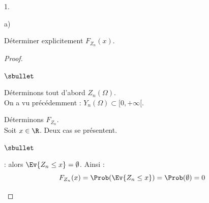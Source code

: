 \documentclass[11pt]{article}%
\begin{document}
\begin{noliste}{1.}
\begin{noliste}{a)}
  \item Déterminer explicitement $F_{Z_{n}}(x)$.
  
  \begin{proof}~%
    \begin{noliste}{$\sbullet$}
    \item Déterminons tout d'abord $Z_n(\Omega)$.\\
      On a vu précédemment : $Y_n(\Omega) \subset [0, +\infty[$.%
      \conc{Comme $Z_n = Y_n - \ln(n)$, on en déduit que $Z_n(\Omega)
        \subset [-\ln(n), +\infty[$}~
    \end{noliste}
    Déterminons $F_{Z_n}$.\\
    Soit $x\in\R$. Deux cas se présentent.
    \begin{noliste}{$\sbullet$}
    \item {} : alors $\Ev{Z_n \leq x} =
      \emptyset$. Ainsi :
      \[
      F_{Z_n}(x) = \Prob(\Ev{Z_n \leq x}) = \Prob(\emptyset) = 0
      \]
      

\end{noliste}
\end{proof}
\end{noliste}
\end{noliste}
\end{document}
